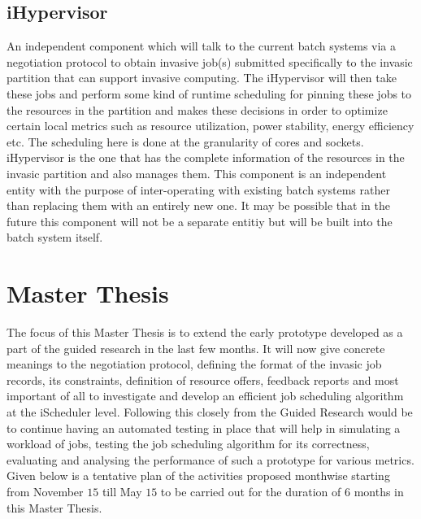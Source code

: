 \documentclass{article}
\begin{document}
\subsection{iHypervisor}
An independent component which will talk to the current batch systems via a negotiation protocol to obtain invasive job(s) submitted specifically to the invasic partition that can support invasive computing. The iHypervisor will then take these jobs and perform some kind of runtime scheduling for pinning these jobs to the resources in the partition and makes these decisions in order to optimize certain local metrics such as resource utilization, power stability, energy efficiency etc. The scheduling here is done at the granularity of cores and sockets. iHypervisor is the one that has the complete information of the resources in the invasic partition and also manages them. This component is an independent entity with the purpose of inter-operating with existing batch systems rather than replacing them with an entirely new one. It may be possible that in the future this component will not be a separate entitiy but will be built into the batch system itself.\par
\section{Master Thesis}
The focus of this Master Thesis is to extend the early prototype developed as a part of the guided research in the last few months. It will now give concrete meanings to the negotiation protocol, defining the format of the invasic job records, its constraints, definition of resource offers, feedback reports and most important of all to investigate and develop an efficient job scheduling algorithm at the iScheduler level. Following this closely from the Guided Research would be to continue having an automated testing in place that will help in simulating a workload of jobs, testing the job scheduling algorithm for its correctness, evaluating and analysing the performance of such a prototype for various metrics. Given below is a tentative plan of the activities proposed monthwise starting from November $15$ till May $15$ to be carried out for the duration of 6 months in this Master Thesis.\par
\end{document}
